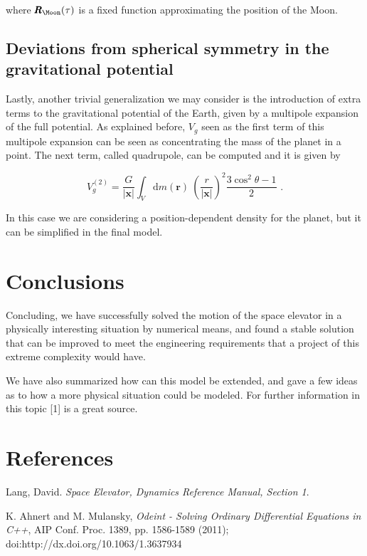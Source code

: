 \documentclass[8 pt, twocolumn]{article}
\newcommand{\dif}{\text{d}}
\renewcommand{\vec}[1]{\pmb{#1}}
\begin{document}
where $\vec{R}_\Moon(\tau)$ is a fixed function approximating the position of the Moon.

\subsection{Deviations from spherical symmetry in the gravitational potential}

Lastly, another trivial generalization we may consider is the introduction of extra terms to the gravitational potential of the Earth, given by a multipole expansion of the full potential. As explained before, $V_g$ seen as the first term of this multipole expansion can be seen as concentrating the mass of the planet in a point. The next term, called quadrupole, can be computed and it is given by

\begin{equation}
  V^{(2)}_g = \frac{G}{|\mathbf{x}|} \int_V \dif m(\mathbf{r}) ~ \left(\frac{r}{|\mathbf{x}|}\right)^2 \frac {3 \cos^2 \theta - 1}{2} \text{ .}
\end{equation}

In this case we are considering a position-dependent density for the planet, but it can be simplified in the final model.

\section{Conclusions}

Concluding, we have successfully solved the motion of the space elevator in a physically interesting situation by numerical means, and found a stable solution that can be improved to meet the engineering requirements that a project of this extreme complexity would have.

We have also summarized how can this model be extended, and gave a few ideas as to how a more physical situation could be modeled. For further information in this topic [1] is a great source.

\section{References}

\begin{enumerate}[label={[\arabic*]}]
  \item Lang, David. \emph{Space Elevator, Dynamics Reference Manual, Section 1}.
  \item K. Ahnert and M. Mulansky, \emph{Odeint - Solving Ordinary Differential Equations in C++}, AIP Conf. Proc. 1389, pp. 1586-1589 (2011); doi:http://dx.doi.org/10.1063/1.3637934
\end{enumerate}
\end{document}
